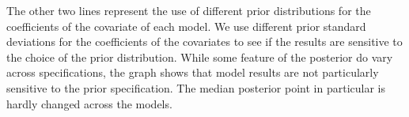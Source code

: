 \documentclass[11pt,titlepage]{article}
\begin{document}
The other two lines represent the use of different prior distributions
for the coefficients of the covariate of each model.  We use different
prior standard deviations for the coefficients of the covariates to
see if the results are sensitive to the choice of the prior
distribution.  While some feature of the posterior do vary across
specifications, the graph shows that model results are not
particularly sensitive to the prior specification.  The median
posterior point in particular is hardly changed across the models.

\singlespacing
%


\end{document}
